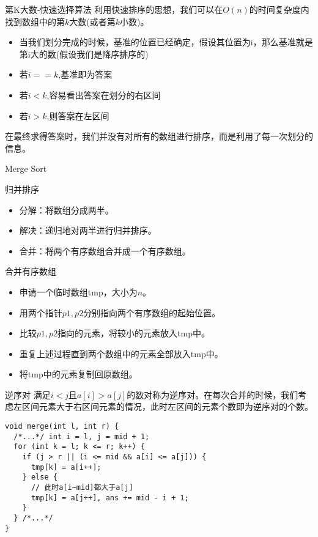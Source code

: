 \documentclass{ldr-simple-gray}
\begin{document}
  \begin{frame}{第K大数-快速选择算法}
    利用快速排序的思想，我们可以在$O(n)$的时间复杂度内找到数组中的第$k$大数(或者第$k$小数)。
    \begin{itemize}
      \item 当我们划分完成的时候，基准的位置已经确定，假设其位置为i，那么基准就是第i大的数(假设我们是降序排序的)
      \item 若$i==k$,基准即为答案
      \item 若$i<k$,容易看出答案在划分的右区间
      \item 若$i>k$,则答案在左区间
    \end{itemize}
    在最终求得答案时，我们并没有对所有的数组进行排序，而是利用了每一次划分的信息。
  \end{frame}

  \begin{frame}{Merge Sort}
    \begin{block}{归并排序}
      \begin{itemize}
        \item 分解：将数组分成两半。
        \item 解决：递归地对两半进行归并排序。
        \item 合并：将两个有序数组合并成一个有序数组。
      \end{itemize}
    \end{block}

    \begin{block}{合并有序数组}
      \begin{itemize}
        \item 申请一个临时数组tmp，大小为$n$。
        \item 用两个指针$p1,p2$分别指向两个有序数组的起始位置。
        \item 比较$p1,p2$指向的元素，将较小的元素放入tmp中。
        \item 重复上述过程直到两个数组中的元素全部放入tmp中。
        \item 将tmp中的元素复制回原数组。
      \end{itemize}
    \end{block}
  \end{frame}

  \begin{frame}[fragile]{逆序对}
    满足$i<j$且$a[i]>a[j]$的数对称为逆序对。在每次合并的时候，我们考虑左区间元素大于右区间元素的情况，此时左区间的元素个数即为逆序对的个数。
    \begin{verbatim}
void merge(int l, int r) {
  /*...*/ int i = l, j = mid + 1;
  for (int k = l; k <= r; k++) {
    if (j > r || (i <= mid && a[i] <= a[j])) {
      tmp[k] = a[i++];
    } else {
      // 此时a[i~mid]都大于a[j]
      tmp[k] = a[j++], ans += mid - i + 1;
    }
  } /*...*/
}\end{verbatim}
  \end{frame}
\end{document}
